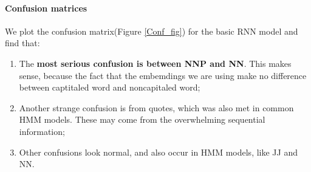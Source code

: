 \documentclass[11pt]{article}
\begin{document}
\paragraph{Confusion matrices} 
We plot the confusion matrix(Figure \ref{Conf_fig}) for the basic RNN model and find that:
\begin{enumerate}
\item The \textbf{most serious confusion is between NNP and NN}. This makes sense, because the fact that the embemdings we are using make no difference between captitaled word and noncapitaled word;
\item  Another strange confusion is from quotes, which was also met in common HMM models. These may come from the overwhelming sequential information;
\item Other confusions look normal, and also occur in HMM models, like JJ and NN.
\end{enumerate}
\end{document}
